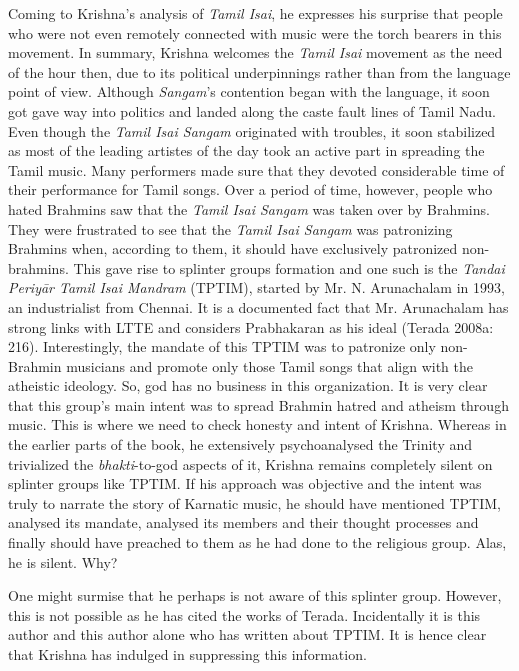Coming to Krishna’s analysis of \textit{Tamil Isai}, he expresses his surprise that people who were not even remotely connected with music were the torch bearers in this movement. In summary, Krishna welcomes the \textit{Tamil Isai} movement as the need of the hour then, due to its political underpinnings rather than from the language point of view. Although \textit{Sangam}’s contention began with the language, it soon got gave way into politics and landed along the caste fault lines of Tamil Nadu. Even though the \textit{Tamil Isai Sangam} originated with troubles, it soon stabilized as most of the leading artistes of the day took an active part in spreading the Tamil music. Many performers made sure that they devoted considerable time of their performance for Tamil songs. Over a period of time, however, people who hated Brahmins saw that the \textit{Tamil Isai Sangam} was taken over by Brahmins. They were frustrated to see that the \textit{Tamil Isai Sangam} was patronizing Brahmins when, according to them, it should have exclusively patronized non-brahmins. This gave rise to splinter groups formation and one such is the \textit{Tandai Periyār Tamil Isai Mandram} (TPTIM), started by Mr. N. Arunachalam in 1993, an industrialist from Chennai. It is a documented fact that Mr. Arunachalam has strong links with LTTE and considers Prabhakaran as his ideal (Terada 2008a: 216). Interestingly, the mandate of this TPTIM was to patronize only non-Brahmin musicians and promote only those Tamil songs that align with the atheistic ideology. So, god has no business in this organization. It is very clear that this group’s main intent was to spread Brahmin hatred and atheism through music. This is where we need to check honesty and intent of Krishna. Whereas in the earlier parts of the book, he extensively psychoanalysed the Trinity and trivialized the \textit{bhakti}-to-god aspects of it, Krishna remains completely silent on splinter groups like TPTIM. If his approach was objective and the intent was truly to narrate the story of Karnatic music, he should have mentioned TPTIM, analysed its mandate, analysed its members and their thought processes and finally should have preached to them as he had done to the religious group. Alas, he is silent. Why?

One might surmise that he perhaps is not aware of this splinter group. However, this is not possible as he has cited the works of Terada. Incidentally it is this author and this author alone who has written about TPTIM. It is hence clear that Krishna has indulged in suppressing this information.

